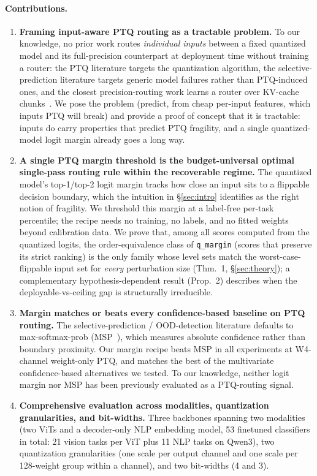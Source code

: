 \documentclass{article}
\newcommand{\ptq}{\textsc{PTQ}\xspace}
\begin{document}
\paragraph{Contributions.}
\begin{enumerate}[leftmargin=*,topsep=2pt,itemsep=2pt]
  \item \textbf{Framing input-aware PTQ routing as a tractable problem.}
        To our knowledge, no prior work routes \emph{individual inputs} between a fixed quantized model and its full-precision counterpart at deployment time without training a router: the PTQ literature targets the quantization algorithm, the selective-prediction literature targets generic model failures rather than PTQ-induced ones, and the closest precision-routing work learns a router over KV-cache chunks~\cite{tao2025moqae}. We pose the problem (predict, from cheap per-input features, which inputs PTQ will break) and provide a proof of concept that it is tractable: inputs do carry properties that predict PTQ fragility, and a single quantized-model logit margin already goes a long way.
  \item \textbf{A single PTQ margin threshold is the budget-universal optimal single-pass routing rule within the recoverable regime.} The quantized model's top-1/top-2 logit margin tracks how close an input sits to a flippable decision boundary, which the intuition in \S\ref{sec:intro} identifies as the right notion of fragility. We threshold this margin at a label-free per-task percentile; the recipe needs no training, no labels, and no fitted weights beyond calibration data. We prove that, among all scores computed from the quantized logits, the order-equivalence class of \texttt{q\_margin} (scores that preserve its strict ranking) is the only family whose level sets match the worst-case-flippable input set for \emph{every} perturbation size (Thm.~1, \S\ref{sec:theory}); a complementary hypothesis-dependent result (Prop.~2) describes when the deployable-vs-ceiling gap is structurally irreducible.
  \item \textbf{Margin matches or beats every confidence-based baseline on
        PTQ routing.} The selective-prediction / OOD-detection literature
        defaults to max-softmax-prob (MSP~\cite{hendrycks2017baseline,
        geifman2017selective}), which measures absolute confidence rather than
        boundary proximity. Our margin recipe beats MSP in all experiments at W4-channel weight-only \ptq{}, and matches the best of the multivariate confidence-based alternatives we tested. To our knowledge, neither logit margin nor MSP has been previously evaluated as a PTQ-routing signal.
   \item \textbf{Comprehensive evaluation across modalities, quantization
        granularities, and bit-widths.} Three backbones spanning two modalities
        (two ViTs and a decoder-only NLP embedding model, 53 finetuned
        classifiers in total: 21 vision tasks per ViT plus 11 NLP tasks on Qwen3), two quantization granularities (one scale per
        output channel and one scale per 128-weight group within a channel),
        and two bit-widths (4 and 3).
\end{enumerate}
\end{document}
